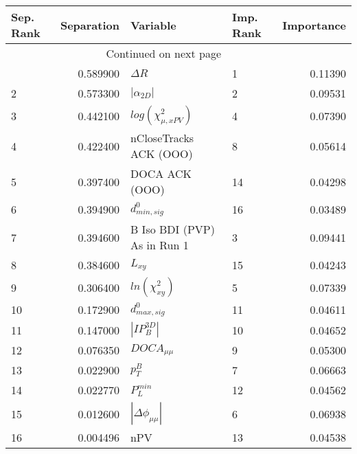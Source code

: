 \usepackage{lscape}

\begin{landscape}
\begin{longtable}{lrllr}
\toprule
Sep. Rank &  Separation &                     Variable & Imp. Rank &  Importance \\
\midrule
\endhead
\midrule
\multicolumn{3}{r}{{Continued on next page}} \\
\midrule
\endfoot

\bottomrule
\endlastfoot
        1 &    0.589900 &                   $\Delta R$ &         1 &     0.11390 \\
        2 &    0.573300 &              $|\alpha_{2D}|$ &         2 &     0.09531 \\
        3 &    0.442100 &    $log(\chi^{2}_{\mu,xPV})$ &         4 &     0.07390 \\
        4 &    0.422400 &       nCloseTracks ACK (OOO) &         8 &     0.05614 \\
        5 &    0.397400 &               DOCA ACK (OOO) &        14 &     0.04298 \\
        6 &    0.394900 &             $d^0_{min, sig}$ &        16 &     0.03489 \\
        7 &    0.394600 &  B Iso BDI (PVP) As in Run 1 &         3 &     0.09441 \\
        8 &    0.384600 &                     $L_{xy}$ &        15 &     0.04243 \\
        9 &    0.306400 &          $ln(\chi^{2}_{xy})$ &         5 &     0.07339 \\
       10 &    0.172900 &             $d^0_{max, sig}$ &        11 &     0.04611 \\
       11 &    0.147000 &              $|IP_{B}^{3D}|$ &        10 &     0.04652 \\
       12 &    0.076350 &              $DOCA_{\mu\mu}$ &         9 &     0.05300 \\
       13 &    0.022900 &                    $p^B_{T}$ &         7 &     0.06663 \\
       14 &    0.022770 &                $P^{min}_{L}$ &        12 &     0.04562 \\
       15 &    0.012600 &     $|\Delta \phi_{\mu\mu}|$ &         6 &     0.06938 \\
       16 &    0.004496 &                          nPV &        13 &     0.04538 \\
\end{longtable}

\end{landscape}
